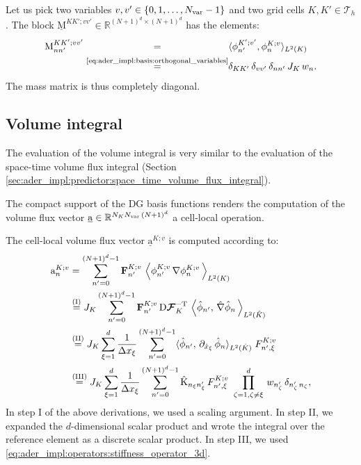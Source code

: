 \documentclass{scrreprt}
\theoremstyle{definition}
\theoremstyle{nonumberplain}
\renewcommand{\vec}[1]{{\textbf{#1}}}
\newcommand{\laVec}[1]{\underline{\mathrm{#1}}}
\newcommand{\laVecel}[1]{\mathrm{#1}}
\newcommand{\laMat}[1]{\underline{\mathrm{#1}}}
\newcommand{\laMatel}[1]{\mathrm{#1}}
\newcommand{\tria}{\mathcal{T}_h}
\newcommand{\cell}{K}
\newcommand{\dV}{\text{d}\vec{x}}
\newcommand{\refVec}[1]{\hat{\vec{#1}}}
\newcommand{\refCell}{\hat{\cell}}
\newcommand{\jacobian}{\textup{D}\boldsymbol{\mathcal{F}}_{\cell}}
\begin{document}
Let us pick two variables $v,v'\in\{0,1,\ldots,N_\textup{var}-1\}$
and two grid cells $\cell,\cell'\in\tria$.
The block $\laMat{M}^{\cell\cell';vv'}\in\mathbb{R}^{(N+1)^{d}\times(N+1)^{d}}$
has the elements:
\begin{align}
\laMatel{M}^{\cell\cell';vv'}_{nn'}
\overset{\phantom{\textup{\eqref{eq:ader_impl:basis:orthogonal_variables}}}}{=}&
\langle {\phi}^{\cell';v'}_{n'},{\phi}^{\cell;v}_{n}\rangle
_{L^2 (\cell) }\,
\notag
\\
\label{eq:ader_impl:correction:mass_operator}
\overset{\textup{\eqref{eq:ader_impl:basis:orthogonal_variables}}}{=}&
\delta_{\cell\cell'}\,\delta_{vv'}\,\delta_{nn'}\,
J_\cell\,w_{n}.
\end{align}
The mass matrix is thus completely diagonal.

\subsection{Volume integral}
The evaluation of the volume integral is very similar 
to the evaluation of the space-time volume flux integral
(Section \ref{sec:ader_impl:predictor:space_time_volume_flux_integral}).

The compact support of the DG basis functions renders the computation of the
volume flux vector $\laVec{a}\in\mathbb{R}^{N_\cell
N_\textup{var}\,(N+1)^d}$ a cell-local operation.

The cell-local volume flux vector $\laVec{a}^{\cell;v}$ is computed
according to:
\begin{align*}
\laVecel{a}^{\cell;v}_{n}
&=
\sum_{n'=0}^{(N+1)^d-1}
\vec{F}^{K;v}_{n'}\,
\left\langle
{\phi}^{K;v}_{n'}\,
\nabla {\phi}^{K;v}_{n}\,
\right\rangle
_{L^2(\cell)}
\\
&\overset{(\textup{I})}
{=}
J_\cell
\sum_{n'=0}^{(N+1)^d-1}
\vec{F}^{K;v}_{n'}\,
\jacobian^{-\textup{T}}\,
\left\langle
\hat{\phi}_{n'},\,
\hat{\nabla}
\hat{\phi}_{n}\,
\right\rangle
_{L^2(\refCell)}
\,
\\
&\overset{(\textup{II})}
{=}
J_\cell
\sum_{\xi=1}^d
\frac{1}{\Delta x_\xi}
\sum_{n'=0}^{(N+1)^d-1}
\langle
\hat{\phi}_{n'},\,
\partial_{\hat{x}_{\xi}}\,\hat{\phi}_{n}
\rangle_{L^2(\refCell)}
\;F^{\cell;v}_{n',\xi}
\\
&\overset{(\textup{III})}
{=}
J_\cell
\sum_{\xi =1}^d
\frac{1}{\Delta x_\xi}
\sum_{n'=0}^{(N+1)^d-1}
\laMatel{\hat{K}}_{n_\xi n'_\xi}\,
F^{\cell;v}_{n',\xi}\,
\,\prod^{d}_{\zeta=1,\zeta\neq\xi}\,w_{n'_\zeta}\,\delta_{n'_\zeta\,n_\zeta},
\end{align*}
In step I of the above derivations, we used a scaling argument.
In step II, we expanded the $d$-dimensional scalar product and
wrote the integral over the reference element as a discrete scalar product.
In step III, we used \eqref{eq:ader_impl:operators:stiffness_operator_3d}.
\end{document}
